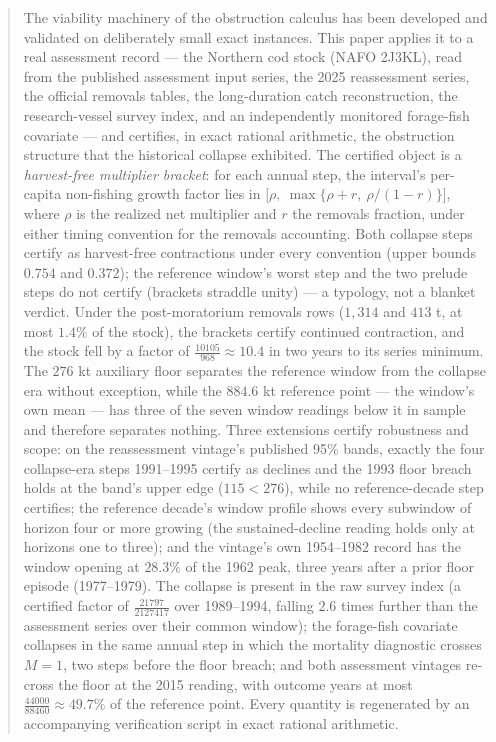 \begin{abstract}
The viability machinery of the obstruction calculus has been developed
and validated on deliberately small exact instances. This paper applies
it to a real assessment record --- the Northern cod stock (NAFO 2J3KL),
read from the published assessment input series, the 2025 reassessment
series, the official removals tables, the long-duration catch
reconstruction, the research-vessel survey index, and an independently
monitored forage-fish covariate --- and certifies, in exact rational
arithmetic, the obstruction structure that the historical collapse
exhibited. The certified object is a \emph{harvest-free multiplier
bracket}: for each annual step, the interval's per-capita non-fishing
growth factor lies in
\(\bigl[\rho,\ \max\{\rho+r,\ \rho/(1-r)\}\bigr]\), where \(\rho\) is
the realized net multiplier and \(r\) the removals fraction, under
either timing convention for the removals accounting. Both collapse
steps certify as harvest-free contractions under every convention
(upper bounds \(0.754\) and \(0.372\)); the reference window's worst
step and the two prelude steps do not certify (brackets straddle
unity) --- a typology, not a blanket verdict. Under the post-moratorium
removals rows (\(1{,}314\) and \(413\) t, at most \(1.4\%\) of the
stock), the brackets certify continued contraction, and the stock fell
by a factor of \(\tfrac{10105}{968} \approx 10.4\) in two years to its
series minimum. The \(276\) kt auxiliary floor separates the reference
window from the collapse era without exception, while the
\(884.6\) kt reference point --- the window's own mean --- has three of
the seven window readings below it in sample and therefore separates
nothing. Three extensions certify robustness and scope: on the
reassessment vintage's published 95\% bands, exactly the four
collapse-era steps 1991--1995 certify as declines and the 1993 floor
breach holds at the band's upper edge (\(115 < 276\)), while no
reference-decade step certifies; the reference decade's window profile
shows every subwindow of horizon four or more growing (the sustained-decline
reading holds only at horizons one to three); and the vintage's own
1954--1982 record has the window opening at \(28.3\%\) of the 1962 peak,
three years after a prior floor episode (1977--1979). The collapse is present in the raw survey index (a certified
factor of \(\tfrac{21797}{2127417}\) over 1989--1994, falling \(2.6\)
times further than the assessment series over their common window);
the forage-fish covariate collapses in the same annual step in which
the mortality diagnostic crosses \(M=1\), two steps before the floor
breach; and both assessment vintages re-cross the floor at the 2015
reading, with outcome years at most
\(\tfrac{44000}{88460} \approx 49.7\%\) of the reference point. Every
quantity is regenerated by an accompanying verification script in
exact rational arithmetic.
\end{abstract}

